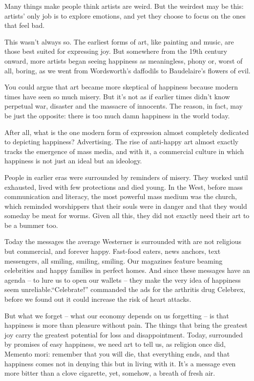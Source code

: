 Many things make people think artists are weird. But the weirdest may be this: artists' only job is to explore emotions, and yet they choose to focus on the ones that feel bad.


This wasn't always so. The earliest forms of art, like painting and music, are those best suited for expressing joy. But somewhere from the 19th century onward, more artists began seeing happiness as meaningless, phony or, worst of all, boring, as we went from Wordsworth's daffodils to Baudelaire's flowers of evil.


You could argue that art became more skeptical of happiness because modern times have seen so much misery. But it's not as if earlier times didn't know perpetual war, disaster and the massacre of innocents. The reason, in fact, may be just the opposite: there is too much damn happiness in the world today.


After all, what is the one modern form of expression almost completely dedicated to depicting happiness? Advertising. The rise of anti-happy art almost exactly tracks the emergence of mass media, and with it, a commercial culture in which happiness is not just an ideal but an ideology.


People in earlier eras were surrounded by reminders of misery. They worked until exhausted, lived with few protections and died young. In the West, before mass communication and literacy, the most powerful mass medium was the church, which reminded worshippers that their souls were in danger and that they would someday be meat for worms. Given all this, they did not exactly need their art to be a bummer too.


Today the messages the average Westerner is surrounded with are not religious but commercial, and forever happy. Fast-food eaters, news anchors, text messengers, all smiling, smiling, smiling. Our magazines feature beaming celebrities and happy families in perfect homes. And since these messages have an agenda – to lure us to open our wallets – they make the very idea of happiness seem unreliable.``Celebrate!'' commanded the ads for the arthritis drug Celebrex, before we found out it could increase the risk of heart attacks.


But what we forget – what our economy depends on us forgetting – is that happiness is more than pleasure without pain. The things that bring the greatest joy carry the greatest potential for loss and disappointment. Today, surrounded by promises of easy happiness, we need art to tell us, as religion once did, Memento mori: remember that you will die, that everything ends, and that happiness comes not in denying this but in living with it. It's a message even more bitter than a clove cigarette, yet, somehow, a breath of fresh air.